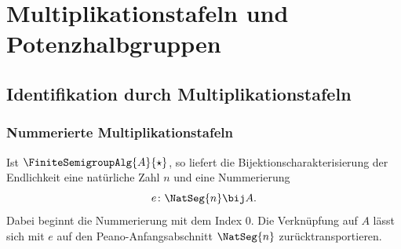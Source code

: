 \documentclass[main.tex]{subfiles}
\begin{document}
\chapter{Multiplikationstafeln und Potenzhalbgruppen}

\section{Identifikation durch Multiplikationstafeln}

\subsection{Nummerierte Multiplikationstafeln}

Ist \(\FiniteSemigroupAlg{A}{\star}\), so liefert die
Bijektionscharakterisierung der Endlichkeit eine natürliche Zahl \(n\) und
eine Nummerierung
\[
  e\colon\NatSeg{n}\bij A.
\]
Dabei beginnt die Nummerierung mit dem Index \(0\).  Die Verknüpfung auf
\(A\) lässt sich mit \(e\) auf den Peano-Anfangsabschnitt
\(\NatSeg{n}\) zurücktransportieren.
\end{document}
